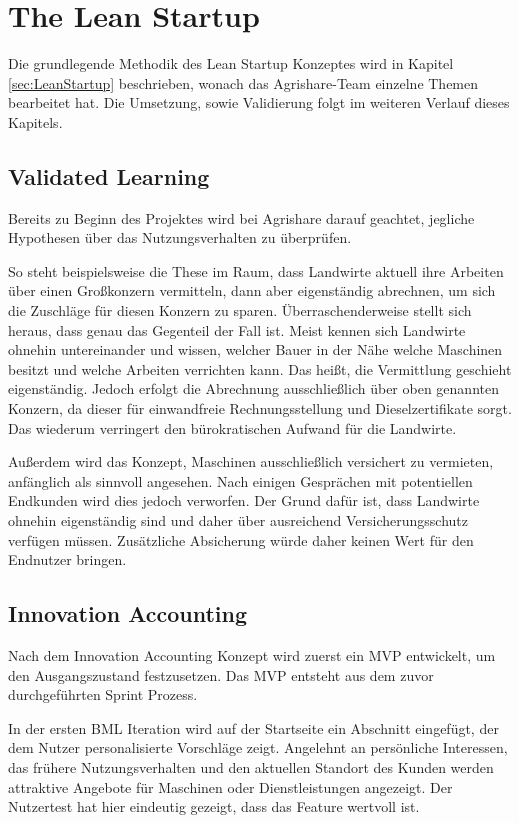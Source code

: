 \section{The Lean Startup}
Die grundlegende Methodik des Lean Startup Konzeptes wird in Kapitel \ref{sec:LeanStartup} beschrieben, wonach das Agrishare-Team einzelne Themen bearbeitet hat. Die Umsetzung, sowie Validierung folgt im weiteren Verlauf dieses Kapitels.
\subsection*{\label{sec:LeanStartup-Umsetzung-ValidatedLearning}\thesubsection\quad Validated Learning}
Bereits zu Beginn des Projektes wird bei Agrishare darauf geachtet, jegliche Hypothesen über das Nutzungsverhalten zu überprüfen. 

So steht beispielsweise die These im Raum, dass Landwirte aktuell ihre Arbeiten über einen Großkonzern vermitteln, dann aber eigenständig abrechnen, um sich die Zuschläge für diesen Konzern zu sparen. Überraschenderweise stellt sich heraus, dass genau das Gegenteil der Fall ist. Meist kennen sich Landwirte ohnehin untereinander und wissen, welcher Bauer in der Nähe welche Maschinen besitzt und welche Arbeiten verrichten kann. Das heißt, die Vermittlung geschieht eigenständig. Jedoch erfolgt die Abrechnung ausschließlich über oben genannten Konzern, da dieser für einwandfreie Rechnungsstellung und Dieselzertifikate sorgt. Das wiederum verringert den bürokratischen Aufwand für die Landwirte.

Außerdem wird das Konzept, Maschinen ausschließlich versichert zu vermieten, anfänglich als sinnvoll angesehen. Nach einigen Gesprächen mit potentiellen Endkunden wird dies jedoch verworfen. Der Grund dafür ist, dass Landwirte ohnehin eigenständig sind und daher über ausreichend Versicherungsschutz verfügen müssen. Zusätzliche Absicherung würde daher keinen Wert für den Endnutzer bringen.

\subsection*{\label{sec:LeanStartup-Umsetzung-InnovationAccounting}\thesubsection\quad Innovation Accounting}
Nach dem Innovation Accounting Konzept wird zuerst ein MVP entwickelt, um den Ausgangszustand festzusetzen. Das \ac{MVP} entsteht aus dem zuvor durchgeführten Sprint Prozess.

In der ersten \ac{BML} Iteration wird auf der Startseite ein Abschnitt eingefügt, der dem Nutzer personalisierte Vorschläge zeigt. Angelehnt an persönliche Interessen, das frühere Nutzungsverhalten und den aktuellen Standort des Kunden werden attraktive Angebote für Maschinen oder Dienstleistungen angezeigt. Der Nutzertest hat hier eindeutig gezeigt, dass das Feature wertvoll ist. 

